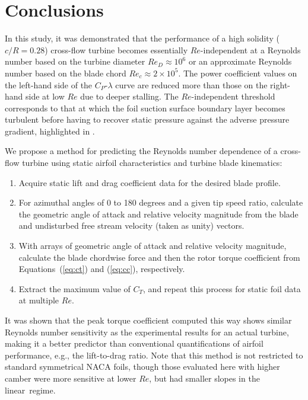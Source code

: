 \documentclass[energies,article,accept,moreauthors,pdftex,10pt,a4paper]{mdpi}
\theoremstyle{mdpi}
\newcounter{ex}
\newcounter{re}
\begin{document}
\section{Conclusions}

In this study, it was demonstrated that the performance of a high solidity
($c/R=0.28$) cross-flow turbine becomes essentially $Re$-independent at a
Reynolds number based on the turbine diameter $Re_D \approx 10^6$ or an
approximate Reynolds number based on the blade chord $Re_c \approx 2 \times
10^5$. The power coefficient values on the left-hand side of the $C_P$-$\lambda$
curve are reduced more than those on the right-hand side at low $Re$ due to
deeper stalling. The $Re$-independent threshold corresponds to that at which the
foil suction surface boundary layer becomes turbulent before having to recover
static pressure against the adverse pressure gradient, highlighted in
\cite{Lissaman1983, McMasters1980, Carmichael1981}.

We propose a method for predicting the Reynolds number dependence of a cross-flow
turbine using static airfoil characteristics and turbine blade kinematics:
\begin{enumerate}
    \item Acquire static lift and drag coefficient data for the desired blade
    profile.

    \item For azimuthal angles of 0 to 180 degrees and a given tip speed ratio,
    calculate the geometric angle of attack and relative velocity magnitude from
    the blade and undisturbed free stream velocity (taken as unity) vectors.

    \item With arrays of geometric angle of attack and relative velocity
    magnitude, calculate the blade chordwise force and then the rotor torque
    coefficient from Equations~(\ref{eq:ct}) and (\ref{eq:cc}), respectively.

    \item Extract the maximum value of $C_T$, and repeat this process for static
    foil data at multiple $Re$.
\end{enumerate}

It was shown that the peak torque coefficient computed this way shows similar
Reynolds number sensitivity as the experimental results for an actual turbine,
making it a better predictor than conventional quantifications of airfoil
performance, e.g., the lift-to-drag ratio. Note that this method is not
restricted to standard symmetrical NACA foils, though those evaluated here with
higher camber were more sensitive at lower $Re$, but had smaller slopes in the
linear~regime.
\end{document}
